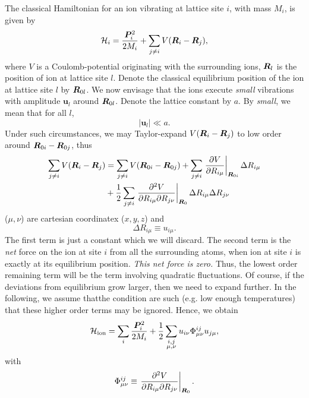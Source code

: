 The classical Hamiltonian for an ion vibrating at lattice site $i$, with mass $M_i$, is given by 
\begin{equation}
	\mathcal{H}_i = \frac{\bm{P}_i^2}{2M_i} + \sum_{j\ne i}V(\bm{R}_i - \bm{R}_j),
\end{equation}
where $V$ is a Coulomb-potential originating with the surrounding ions, $\bm{R}_l$ is the position of ion at lattice site $l$.
Denote the classical equilibrium position of the ion at lattice site $l$ by $\bm{R}_{0l}$. We now envisage that the ions execute \emph{small} vibrations with amplitude $\bm{u}_l$ around $\bm{R}_{0l}$.
Denote the lattice constant by $a$.
By \emph{small}, we mean that for all $l$, 
\begin{equation}
	|\bm{u}_l|\ll a.
\end{equation}
Under such circumstances, we may Taylor-expand $V(\bm{R}_i - \bm{R}_j)$ to low order around $\bm{R}_{0i}-\bm{R}_{0j}$, thus
\begin{align}
	\sum_{j\ne i}V(\bm{R}_i -\bm{R}_j) &= \sum_{j\ne i}V(\bm{R}_{0i}-\bm{R}_{0j}) + \sum_{j\ne i}\left .\pdv{V}{R_{i\mu}}\right |_{\bm{R}_{0i}}\Delta R_{i\mu}\nonumber \\
	& + \frac{1}{2}\sum_{j\ne i} \left . \pdv{V}{R_{i\mu}}{R_{j\nu}}\right |_{\bm{R}_{0}}\Delta R_{i\mu}\Delta R_{j\nu}
\end{align}
($\mu,\nu$) are cartesian coordinatex ($x,y,z$) and
\begin{equation}
	\Delta R_{i\mu} \equiv u_{i\mu}.
\end{equation}
The first term is just a constant which we will discard.
The second term is the \emph{net} force on the ion at site $i$ from all the surrounding atoms, when ion at site $i$ is exactly at its equilibrium position. \emph{This net force is zero.} Thus, the lowest order remaining term will be the term involving quadratic fluctuations. 
Of course, if the deviations from equilibrium grow larger, then we need to expand further. In the following, we assume thatthe condition are such (e.g. low enough temperatures) that these higher order terms may be ignored. Hence, we obtain
\begin{equation}
	\Ha_{\text{ion}} = \sum_{i}\frac{\bm{P}_i^2}{2M_i} + \frac{1}{2}\sum_{\mathclap{\substack{i,j\\ \mu,\nu}}}u_{i\nu}\Phi_{\mu\nu}^{ij}u_{j\mu},
\end{equation}
with 
\begin{equation}
\Phi_{\mu\nu}^{ij}\equiv \left . \pdv{V}{R_{i\mu}}{R_{j\nu}}\right |_{\bm{R}_{0}}.
\end{equation}
